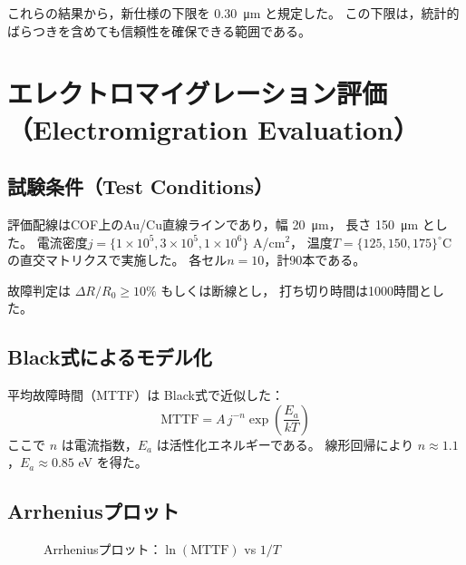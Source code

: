 \documentclass[conference]{IEEEtran}
\begin{document}
これらの結果から，新仕様の下限を \SI{0.30}{\micro\meter} と規定した。
この下限は，統計的ばらつきを含めても信頼性を確保できる範囲である。

\section{エレクトロマイグレーション評価（Electromigration Evaluation）}

\subsection{試験条件（Test Conditions）}
評価配線はCOF上のAu/Cu直線ラインであり，幅 \SI{20}{\micro\meter}，
長さ \SI{150}{\micro\meter} とした。
電流密度$j=\{1\times10^5, 3\times10^5, 1\times10^6\}$ A/cm$^2$，
温度$T=\{125,150,175\}^\circ$C の直交マトリクスで実施した。
各セル$n=10$，計90本である。

故障判定は $\Delta R/R_0 \geq 10\%$ もしくは断線とし，
打ち切り時間は1000時間とした。

\subsection{Black式によるモデル化}
平均故障時間（MTTF）は Black式で近似した：
\begin{equation}
  \mathrm{MTTF} = A \, j^{-n} \exp\!\left(\frac{E_a}{kT}\right)
  \label{eq:black}
\end{equation}
ここで $n$ は電流指数，$E_a$ は活性化エネルギーである。
線形回帰により $n \approx 1.1$，$E_a \approx 0.85$ eV を得た。

\subsection{Arrheniusプロット}
\begin{figure}[htbp]
  \centering
  \caption{Arrheniusプロット：$\ln(\mathrm{MTTF})$ vs $1/T$}
  \label{fig:em-arr}
\end{figure}
\end{document}
